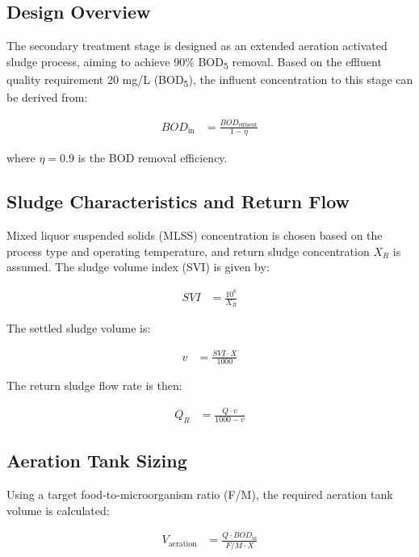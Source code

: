 \documentclass[12pt]{article}
\begin{document}
\subsection{Design Overview}

The secondary treatment stage is designed as an extended aeration activated sludge process, aiming to achieve 90\% BOD\textsubscript{5} removal. Based on the effluent quality requirement 20 mg/L (BOD\textsubscript{5}), the influent concentration to this stage can be derived from:

\begin{align}
BOD_{\text{in}} &= \frac{BOD_{\text{effluent}}}{1 - \eta}
\label{eq:secondary_bod_in}
\end{align}

where \( \eta = 0.9 \) is the BOD removal efficiency.

\subsection{Sludge Characteristics and Return Flow}

Mixed liquor suspended solids (MLSS) concentration is chosen based on the process type and operating temperature, and return sludge concentration \( X_R \) is assumed. The sludge volume index (SVI) is given by:

\begin{align}
SVI &= \frac{10^6}{X_R}
\end{align}

The settled sludge volume is:

\begin{align}
v &= \frac{SVI \cdot X}{1000}
\end{align}

The return sludge flow rate is then:

\begin{align}
Q_R &= \frac{Q \cdot v}{1000 - v}
\end{align}

\subsection{Aeration Tank Sizing}

Using a target food-to-microorganism ratio (F/M), the required aeration tank volume is calculated:

\begin{align}
V_{\text{aeration}} &= \frac{Q \cdot BOD_{\text{in}}}{F/M \cdot X}
\label{eq:aeration_volume}
\end{align}
\end{document}
